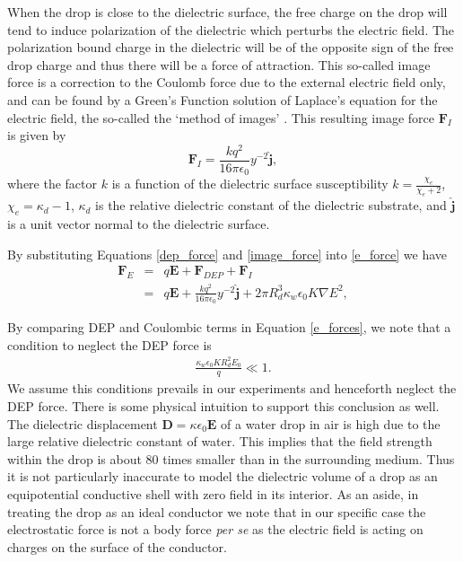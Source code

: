 \documentclass[aip,reprint, floatfix]{revtex4-1}
\begin{document}
When the drop is close to the dielectric surface, the free charge on the drop will tend to induce polarization of the dielectric which perturbs the electric field. The polarization bound charge in the dielectric will be of the opposite sign of the free drop charge and thus there will be a force of attraction. This so-called image force is a correction to the Coulomb force due to the external electric field only, and can be found by a Green's Function solution of Laplace's equation for the electric field, the so-called the `method of images' \cite{david_j._griffiths_introduction_1999}. This resulting image force $\mathbf{F}_I$ is given by
\begin{equation}
\mathbf{F}_I = \frac{k q^2}{16 \pi \epsilon_0} y^{-2} \hat{\mathbf{j}},
\label{image_force}
\end{equation}
where the factor $k$ is a function of the dielectric surface susceptibility $k = \frac{\chi_e}{\chi_e + 2}$, $\chi_e = \kappa_d - 1$, $\kappa_d$ is the relative dielectric constant of the dielectric substrate, and $\hat{\mathbf{j}}$ is a unit vector normal to the dielectric surface.

By substituting Equations \ref{dep_force} and \ref{image_force} into \ref{e_force} we have
\begin{eqnarray}
 \mathbf{F}_E &=& q \mathbf{E} + \mathbf{F}_{DEP} + \mathbf{F}_I \nonumber \\
 &=& q \mathbf{E} + \frac{k q^2}{16 \pi \epsilon_0 } y^{-2} \hat{\mathbf{j}} + 2 \pi R_d^3 \kappa_w \epsilon_0 K \nabla E^2, 
 \label{e_forces}
\end{eqnarray}

By comparing DEP and Coulombic terms in Equation \ref{e_forces}, we note that a condition to neglect the DEP force is
\begin{eqnarray}
\frac{ \kappa_w \epsilon_0 K R_d^2 E_0}{q} \ll 1. \nonumber
\end{eqnarray}
We assume this conditions prevails in our experiments and henceforth neglect the DEP force. There is some physical intuition to support this conclusion as well. The dielectric displacement $\mathbf{D} = \kappa \epsilon_0 \mathbf{E}$ of a water drop in air is high due to the large relative dielectric constant of water. This implies that the field strength within the drop is about 80 times smaller than in the surrounding medium. Thus it is not particularly inaccurate to model the dielectric volume of a drop as an equipotential conductive shell with zero field in its interior. As an aside, in treating the drop as an ideal conductor we note that in our specific case the electrostatic force is not a body force \emph{per se} as the electric field is acting on charges on the surface of the conductor.
\end{document}

